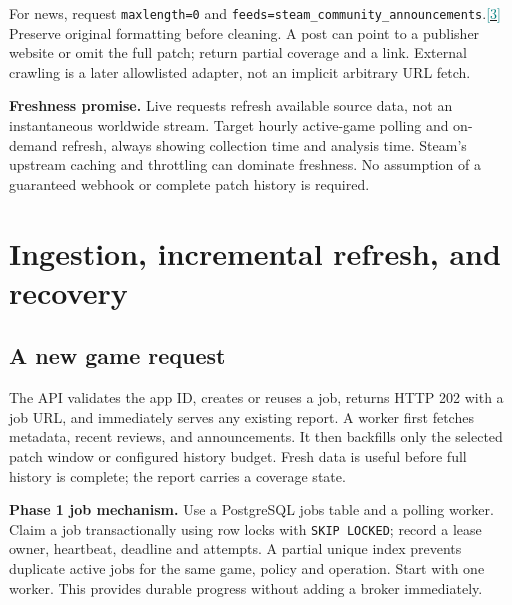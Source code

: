 \documentclass[10pt,letterpaper]{article}
\newcommand{\sr}[1]{\hyperlink{src#1}{\textcolor{teal}{[#1]}}}
\newcommand{\key}[1]{\textbf{\color{ink}#1}}
\newcommand{\nextsection}[1]{\clearpage\section{#1}}
\newenvironment{decision}{\begin{tcolorbox}[colback=pale,colframe=teal,boxrule=0.5pt,arc=2pt,left=9pt,right=9pt,top=6pt,bottom=6pt]}{\end{tcolorbox}}
\begin{document}
For news, request \texttt{maxlength=0} and \texttt{feeds=steam\_community\_announcements}.\sr{3} Preserve original formatting before cleaning. A post can point to a publisher website or omit the full patch; return partial coverage and a link. External crawling is a later allowlisted adapter, not an implicit arbitrary URL fetch.

\begin{decision}
\key{Freshness promise.} Live requests refresh available source data, not an instantaneous worldwide stream. Target hourly active-game polling and on-demand refresh, always showing collection time and analysis time. Steam's upstream caching and throttling can dominate freshness. No assumption of a guaranteed webhook or complete patch history is required.
\end{decision}

\nextsection{Ingestion, incremental refresh, and recovery}
\subsection{A new game request}
The API validates the app ID, creates or reuses a job, returns HTTP 202 with a job URL, and immediately serves any existing report. A worker first fetches metadata, recent reviews, and announcements. It then backfills only the selected patch window or configured history budget. Fresh data is useful before full history is complete; the report carries a coverage state.

\key{Phase 1 job mechanism.} Use a PostgreSQL jobs table and a polling worker. Claim a job transactionally using row locks with \texttt{SKIP LOCKED}; record a lease owner, heartbeat, deadline and attempts. A partial unique index prevents duplicate active jobs for the same game, policy and operation. Start with one worker. This provides durable progress without adding a broker immediately.
\end{document}
